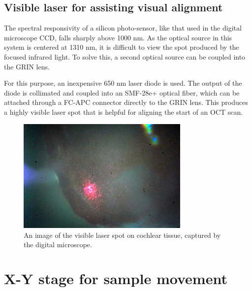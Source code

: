 \subsection{Visible laser for assisting visual alignment}


The spectral responsivity of a silicon photo-sensor, like that used in the digital microscope CCD, falls sharply above 1000 nm. As the optical source in this system is centered at 1310 nm, it is difficult to view the spot produced by the focused infrared light. To solve this, a second optical source can be coupled into the GRIN lens.

For this purpose, an inexpensive 650 nm laser diode is used. The output of the diode is collimated and coupled into an SMF-28e+ optical fiber, which can be attached through a FC-APC connector directly to the GRIN lens. This produces a highly visible laser spot that is helpful for aligning the start of an OCT scan.

\begin{figure}[h!]
\centering
\includegraphics[width=0.75\textwidth]{Images/System/alignment_laser.jpg}
\caption[An image of the visible laser spot on cochlear tissue.]{An image of the visible laser spot on cochlear tissue, captured by the digital microscope.}
\end{figure}


\section{X-Y stage for sample movement}

